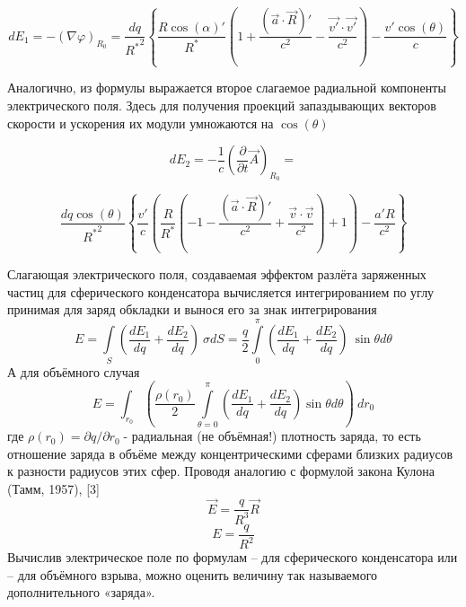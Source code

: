 ﻿\documentclass{article}
\begin{document}
	\[d{{E}_{1}}=-{{\left( \nabla \varphi  \right)}_{{{R}_{0}}}}=\frac{dq}{{{R}^{*}}^{2}}\left\{ \frac{R\cos \left( \alpha  \right)'}{{{R}^{*}}}\left( 1+\frac{\left( \overrightarrow{a}\cdot \overrightarrow{R} \right)'}{{{c}^{2}}}-\frac{\overrightarrow{v'}\cdot \overrightarrow{v'}}{{{c}^{2}}} \right)-\frac{v'\cos \left( \theta  \right)}{c} \right\}\]

Аналогично, из формулы  выражается второе слагаемое радиальной компоненты электрического поля. Здесь для получения проекций запаздывающих векторов скорости и ускорения их модули умножаются на $\cos \left( \theta  \right)$

	\[d{{E}_{2}}=-\frac{1}{c}{{\left( \frac{\partial }{\partial t}\overrightarrow{A} \right)}_{{{R}_{0}}}}=\]

\[\frac{dq\cos \left( \theta  \right)}{{{R}^{*}}^{2}}\left\{ \frac{v'}{c}\left( \frac{R}{{{R}^{*}}}\left( -1-\frac{\left( \overrightarrow{a}\cdot \overrightarrow{R} \right)'}{{{c}^{2}}}+\frac{\overrightarrow{v}\cdot \overrightarrow{v}}{{{c}^{2}}} \right)+1 \right)-\frac{a'R}{{{c}^{2}}} \right\}\] 

Слагающая электрического поля, создаваемая эффектом разлёта заряженных частиц для сферического конденсатора вычисляется интегрированием по углу  принимая для  заряд обкладки и вынося его за знак интегрирования
	\[E=\int\limits_{S}{\left( \frac{d{{E}_{1}}}{dq}+\frac{d{{E}_{2}}}{dq} \right)\ }\sigma dS=\frac{q}{2}\int\limits_{0}^{\pi }{\left( \frac{d{{E}_{1}}}{dq}+\frac{d{{E}_{2}}}{dq} \right)}\ \sin \theta d\theta \]
А для объёмного случая
	\[E=\int_{{{r}_{0}}}{\left( \frac{\rho \left( {{r}_{0}} \right)}{2}\int\limits_{\theta =0}^{\pi }{\left( \frac{d{{E}_{1}}}{dq}+\frac{d{{E}_{2}}}{dq} \right)\sin \theta d\theta } \right)}\ d{{r}_{0}}\]
где ${\rho \left( {{r}_{0}} \right)=\partial q}/{\partial {{r}_{0}}}\;$- радиальная (не объёмная!) плотность заряда, то есть отношение заряда в объёме между концентрическими сферами близких радиусов к разности радиусов этих сфер.
Проводя аналогию с формулой закона Кулона (Тамм, 1957), [3]
	\[\overrightarrow{E}=\frac{q}{{{R}^{3}}} \overrightarrow{R}\] \[E=\frac{q}{{{R}^{2}}}\]
Вычислив электрическое поле по формулам  – для сферического конденсатора или  – для объёмного взрыва, можно оценить величину так называемого дополнительного «заряда».
\end{document}
